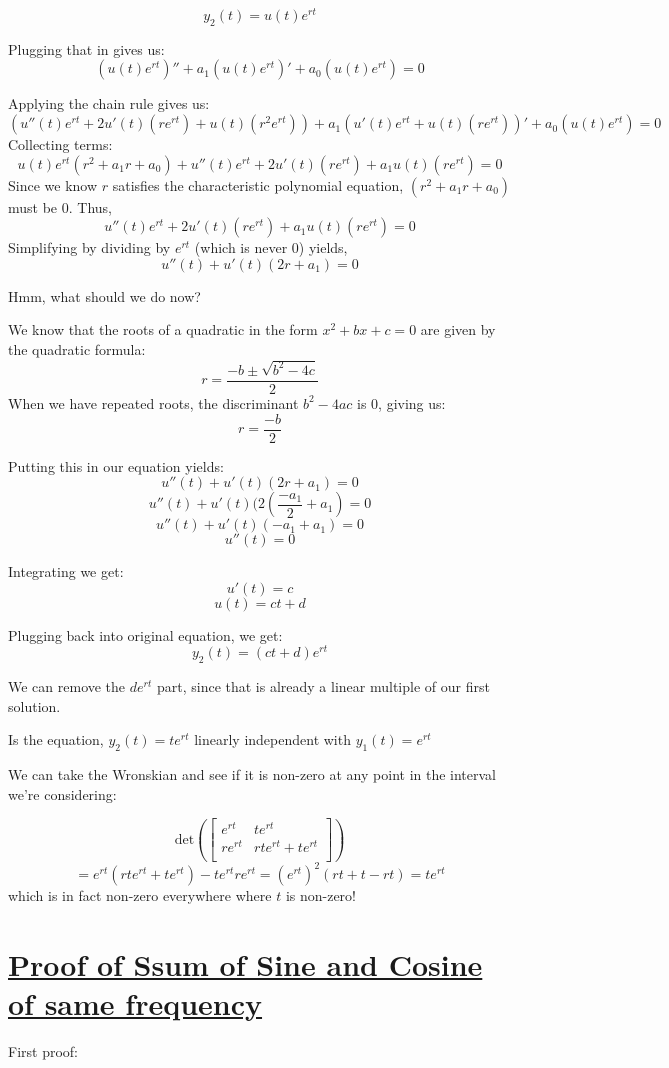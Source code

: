 \documentclass{report}
\begin{document}
{$$y_2(t) = u(t)e^{rt}$$

Plugging that in gives us:
$$(u(t)e^{rt})'' + a_1(u(t)e^{rt})' + a_0(u(t)e^{rt}) = 0$$

Applying the chain rule gives us:
$$(u''(t)e^{rt}+2u'(t)(re^{rt}) + u(t)(r^2e^{rt})) + a_1(u'(t)e^{rt} + u(t)(re^{rt}))' + a_0(u(t)e^{rt}) = 0$$
Collecting terms:
$$u(t)e^{rt}(r^2+a_1r+a_0) +u''(t)e^{rt} + 2u'(t)(re^{rt}) + a_1 u(t)(re^{rt}) = 0$$
Since we know $r$ satisfies the characteristic polynomial equation, $(r^2+a_1r+a_0)$ must be 0. Thus,
$$u''(t)e^{rt} + 2u'(t)(re^{rt}) + a_1 u(t)(re^{rt}) = 0$$
Simplifying by dividing by $e^{rt}$ (which is never 0) yields,
$$u''(t) + u'(t)(2r+a_1) = 0$$

Hmm, what should we do now?

We know that the roots of a quadratic in the form $x^2 + bx + c = 0$ are given by the quadratic formula:
$$r = \frac{-b \pm \sqrt{b^2-4c}}{2}$$
When we have repeated roots, the discriminant $b^2-4ac$ is 0, giving us:
$$r = \frac{-b}{2}$$


Putting this in our equation yields:
$$u''(t)+u'(t)(2r+a_1) = 0$$
$$u''(t)+u'(t)(2(\frac{-a_1}{2}+a_1) = 0$$
$$u''(t) + u'(t)(-a_1+a_1) = 0$$
$$u''(t) = 0$$

Integrating we get:
$$u'(t) = c$$
$$u(t) = ct + d$$

Plugging back into original equation, we get:
$$y_2(t) = (ct+d)e^{rt}$$

We can remove the $de^{rt}$ part, since that is already a linear multiple of our first solution.

Is the equation, $y_2(t) = te^{rt}$ linearly independent with $y_1(t) = e^{rt}$

We can take the Wronskian and see if it is non-zero at any point in the interval we're considering:


$$
    \text{det}\left(\begin{bmatrix}
        e^{rt} & te^{rt}\\
        re^{rt} & rte^{rt}+ te^{rt} \\
    \end{bmatrix}\right)
$$
$$
    = e^{rt}(rte^{rt}+te^{rt}) - te^{rt}re^{rt}
    = (e^{rt})^2(rt+t-rt)
    = te^{rt}
$$
which is in fact non-zero everywhere where $t$ is non-zero!

\section{\hyperref[th:sinPlusCosin]{Proof of Ssum of Sine and Cosine of same frequency}}
\label{sec:prSinPlusCosin}
First proof:

}
\end{document}
